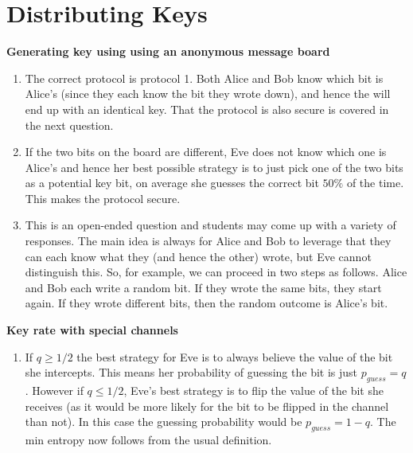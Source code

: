 
\chapter{Distributing Keys}

\begin{exercises}


\item {\bf Generating key using using an anonymous message board}

\begin{enumerate}
\item The correct protocol is protocol 1. Both Alice and Bob know which bit is Alice's (since they each know the bit they wrote down), and hence the will end up with an identical key. That the protocol is also secure is covered in the next question.

\item If the two bits on the board are different, Eve does not know which one is Alice's and hence her best possible strategy is to just pick one of the two bits as a potential key bit, on average she guesses the correct bit \(50\%\) of the time. This makes the protocol secure.

\item This is an open-ended question and students may come up with a variety of responses. The main idea is always for Alice and Bob to leverage that they can each know what they (and hence the other) wrote, but Eve cannot distinguish this. So, for example, we can proceed in two steps as follows. Alice and Bob each write a random bit. If they wrote the same bits, they start again. If they wrote different bits, then the random outcome is Alice's bit. 

\end{enumerate}


\item {\bf Key rate with special channels}

\begin{enumerate}
\item If \(q\geq1/2\) the best strategy for Eve is to always believe the value of the bit she intercepts. This means her probability of guessing the bit is just \(p_{guess} = q\). However if \(q\leq 1/2\), Eve's best strategy is to flip the value of the bit she receives (as it would be more likely for the bit to be flipped in the channel than not). In this case the guessing probability would be \(p_{guess} = 1-q\). The min entropy now follows from the usual definition.


\end{enumerate}
\end{exercises}
